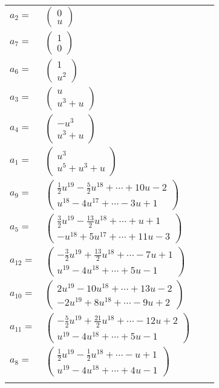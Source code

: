 \documentclass[1p]{elsarticle_modified}
\theoremstyle{definition}
\begin{document}
\begin{tabular}{m{7pt} m{180pt} m{7pt} m{180pt} }
\flushright $a_{2}=$&$\begin{pmatrix}0\\u\end{pmatrix}$ \\
\flushright $a_{7}=$&$\begin{pmatrix}1\\0\end{pmatrix}$ \\
\flushright $a_{6}=$&$\begin{pmatrix}1\\u^2\end{pmatrix}$ \\
\flushright $a_{3}=$&$\begin{pmatrix}u\\u^3+u\end{pmatrix}$ \\
\flushright $a_{4}=$&$\begin{pmatrix}- u^3\\u^3+u\end{pmatrix}$ \\
\flushright $a_{1}=$&$\begin{pmatrix}u^3\\u^5+u^3+u\end{pmatrix}$ \\
\flushright $a_{9}=$&$\begin{pmatrix}\frac{1}{2} u^{19}-\frac{5}{2} u^{18}+\cdots+10 u-2\\u^{18}-4 u^{17}+\cdots-3 u+1\end{pmatrix}$ \\
\flushright $a_{5}=$&$\begin{pmatrix}\frac{3}{2} u^{19}-\frac{13}{2} u^{18}+\cdots+u+1\\- u^{18}+5 u^{17}+\cdots+11 u-3\end{pmatrix}$ \\
\flushright $a_{12}=$&$\begin{pmatrix}-\frac{3}{2} u^{19}+\frac{13}{2} u^{18}+\cdots-7 u+1\\u^{19}-4 u^{18}+\cdots+5 u-1\end{pmatrix}$ \\
\flushright $a_{10}=$&$\begin{pmatrix}2 u^{19}-10 u^{18}+\cdots+13 u-2\\-2 u^{19}+8 u^{18}+\cdots-9 u+2\end{pmatrix}$ \\
\flushright $a_{11}=$&$\begin{pmatrix}-\frac{5}{2} u^{19}+\frac{21}{2} u^{18}+\cdots-12 u+2\\u^{19}-4 u^{18}+\cdots+5 u-1\end{pmatrix}$ \\
\flushright $a_{8}=$&$\begin{pmatrix}\frac{1}{2} u^{19}-\frac{1}{2} u^{18}+\cdots- u+1\\u^{19}-4 u^{18}+\cdots+4 u-1\end{pmatrix}$\\&\end{tabular}
\end{document}

